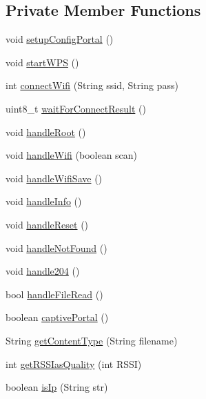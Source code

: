 \subsection*{Private Member Functions}
\begin{DoxyCompactItemize}
\item 
void \hyperlink{class_wi_fi_manager_a1743325d0dd86d011df96b22d2a0ddd6}{setup\+Config\+Portal} ()
\item 
void \hyperlink{class_wi_fi_manager_abcc403fc26a47f7a111d1271f1d0869e}{start\+W\+PS} ()
\item 
int \hyperlink{class_wi_fi_manager_ae0ae27b5543b47585728c084c3bbdca7}{connect\+Wifi} (String ssid, String pass)
\item 
uint8\+\_\+t \hyperlink{class_wi_fi_manager_a89a3f33997aa662ad223d6c150c1eede}{wait\+For\+Connect\+Result} ()
\item 
void \hyperlink{class_wi_fi_manager_a47e4c7df7478f690c53ff9f5125c9760}{handle\+Root} ()
\item 
void \hyperlink{class_wi_fi_manager_a57a9048175c1918340ab9d0a2c53601f}{handle\+Wifi} (boolean scan)
\item 
void \hyperlink{class_wi_fi_manager_a2a8c2b60aa86dfdeab8a1a90f7122dc7}{handle\+Wifi\+Save} ()
\item 
void \hyperlink{class_wi_fi_manager_ac35e46661f8a209d84bba62d9aa43a35}{handle\+Info} ()
\item 
void \hyperlink{class_wi_fi_manager_a94fb1a8fcfbd0d02714c69138bf72f9c}{handle\+Reset} ()
\item 
void \hyperlink{class_wi_fi_manager_a7d01f7de3e4b76acdabffac79fa3d0ab}{handle\+Not\+Found} ()
\item 
void \hyperlink{class_wi_fi_manager_ac924dc071144e609afcf52073176c11f}{handle204} ()
\item 
bool \hyperlink{class_wi_fi_manager_abed7fbbdab409fc8aba2a5c00f3d2db1}{handle\+File\+Read} ()
\item 
boolean \hyperlink{class_wi_fi_manager_a4ef4298deb224212e5242c456669a973}{captive\+Portal} ()
\item 
String \hyperlink{class_wi_fi_manager_a40f123fd290c3e331c9785d19a88f3b8}{get\+Content\+Type} (String filename)
\item 
int \hyperlink{class_wi_fi_manager_ae71cfd6bd70ada2ca02e1d20b152d0e5}{get\+R\+S\+S\+Ias\+Quality} (int R\+S\+SI)
\item 
boolean \hyperlink{class_wi_fi_manager_a9c78a8774f746ec22a99d03a53baa607}{is\+Ip} (String str)
\item 

\end{DoxyCompactItemize}
